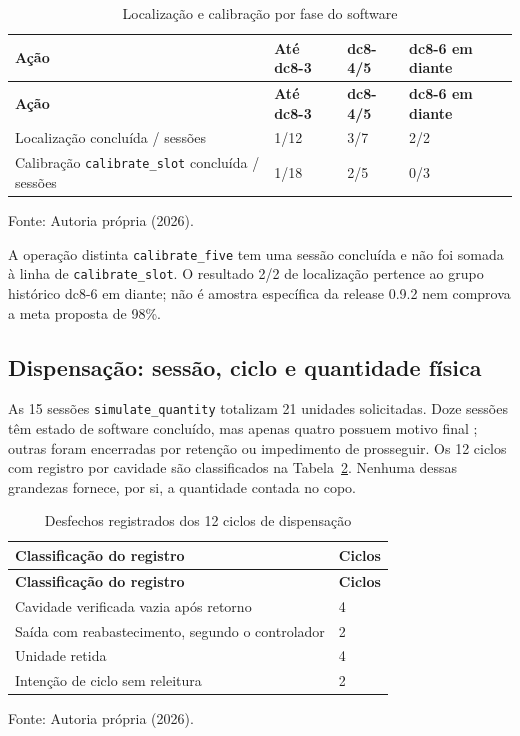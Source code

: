{\small\setlength{\tabcolsep}{3pt}
\begin{longtable}{p{}p{}p{}p{}}
\caption{Localização e calibração por fase do software}\label{tab:result-sessoes}\\
\hline\textbf{Ação} & \textbf{Até dc8-3} & \textbf{dc8-4/5} & \textbf{dc8-6 em diante}\\\hline\endfirsthead
\hline\textbf{Ação} & \textbf{Até dc8-3} & \textbf{dc8-4/5} & \textbf{dc8-6 em diante}\\\hline\endhead
Localização concluída / sessões & 1/12 & 3/7 & 2/2\\\hline
Calibração \texttt{calibrate\_slot} concluída / sessões & 1/18 & 2/5 & 0/3\\\hline
\end{longtable}
\noindent Fonte: Autoria própria (2026).\par}
A operação distinta \texttt{calibrate\_five} tem uma sessão concluída e não foi somada à linha de \texttt{calibrate\_slot}. O resultado 2/2 de localização pertence ao grupo histórico dc8-6 em diante; não é amostra específica da release 0.9.2 nem comprova a meta proposta de 98\%.

\subsection{Dispensação: sessão, ciclo e quantidade física}
As 15 sessões \texttt{simulate\_quantity} totalizam 21 unidades solicitadas. Doze sessões têm estado de software concluído, mas apenas quatro possuem motivo final ; outras foram encerradas por retenção ou impedimento de prosseguir. Os 12 ciclos com registro por cavidade são classificados na Tabela~\ref{tab:result-ciclos}. Nenhuma dessas grandezas fornece, por si, a quantidade contada no copo. 

{\small\begin{longtable}{p{}p{}}
\caption{Desfechos registrados dos 12 ciclos de dispensação}\label{tab:result-ciclos}\\
\hline\textbf{Classificação do registro} & \textbf{Ciclos}\\\hline\endfirsthead
\hline\textbf{Classificação do registro} & \textbf{Ciclos}\\\hline\endhead
Cavidade verificada vazia após retorno & 4\\\hline
Saída com reabastecimento, segundo o controlador & 2\\\hline
Unidade retida & 4\\\hline
Intenção de ciclo sem releitura & 2\\\hline
\end{longtable}\noindent Fonte: Autoria própria (2026).\par}

